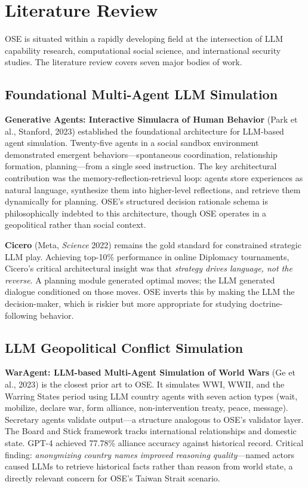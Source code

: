 \documentclass[12pt, a4paper]{article}
\begin{document}
\section{Literature Review}

OSE is situated within a rapidly developing field at the intersection of LLM capability research, computational social science, and international security studies. The literature review covers seven major bodies of work.

\subsection{Foundational Multi-Agent LLM Simulation}

\textbf{Generative Agents: Interactive Simulacra of Human Behavior} (Park et al., Stanford, 2023) established the foundational architecture for LLM-based agent simulation. Twenty-five agents in a social sandbox environment demonstrated emergent behaviors---spontaneous coordination, relationship formation, planning---from a single seed instruction. The key architectural contribution was the memory-reflection-retrieval loop: agents store experiences as natural language, synthesize them into higher-level reflections, and retrieve them dynamically for planning. OSE's structured decision rationale schema is philosophically indebted to this architecture, though OSE operates in a geopolitical rather than social context.

\textbf{Cicero} (Meta, \textit{Science} 2022) remains the gold standard for constrained strategic LLM play. Achieving top-10\% performance in online Diplomacy tournaments, Cicero's critical architectural insight was that \textit{strategy drives language, not the reverse}. A planning module generated optimal moves; the LLM generated dialogue conditioned on those moves. OSE inverts this by making the LLM the decision-maker, which is riskier but more appropriate for studying doctrine-following behavior.

\subsection{LLM Geopolitical Conflict Simulation}

\textbf{WarAgent: LLM-based Multi-Agent Simulation of World Wars} (Ge et al., 2023) is the closest prior art to OSE. It simulates WWI, WWII, and the Warring States period using LLM country agents with seven action types (wait, mobilize, declare war, form alliance, non-intervention treaty, peace, message). Secretary agents validate output---a structure analogous to OSE's validator layer. The Board and Stick framework tracks international relationships and domestic state. GPT-4 achieved 77.78\% alliance accuracy against historical record. Critical finding: \textit{anonymizing country names improved reasoning quality}---named actors caused LLMs to retrieve historical facts rather than reason from world state, a directly relevant concern for OSE's Taiwan Strait scenario.
\end{document}

